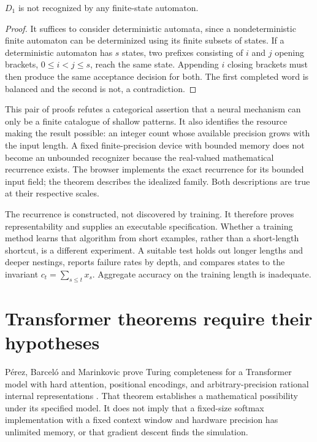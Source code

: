 \begin{proposition}
$D_1$ is not recognized by any finite-state automaton.
\end{proposition}
\begin{proof}
It suffices to consider deterministic automata, since a nondeterministic finite automaton can be determinized using its finite subsets of states. If a deterministic automaton has $s$ states, two prefixes consisting of $i$ and $j$ opening brackets, $0\le i<j\le s$, reach the same state. Appending $i$ closing brackets must then produce the same acceptance decision for both. The first completed word is balanced and the second is not, a contradiction.
\end{proof}

This pair of proofs refutes a categorical assertion that a neural mechanism can only be a finite catalogue of shallow patterns. It also identifies the resource making the result possible: an integer count whose available precision grows with the input length. A fixed finite-precision device with bounded memory does not become an unbounded recognizer because the real-valued mathematical recurrence exists. The browser implements the exact recurrence for its bounded input field; the theorem describes the idealized family. Both descriptions are true at their respective scales.

The recurrence is constructed, not discovered by training. It therefore proves representability and supplies an executable specification. Whether a training method learns that algorithm from short examples, rather than a short-length shortcut, is a different experiment. A suitable test holds out longer lengths and deeper nestings, reports failure rates by depth, and compares states to the invariant $c_t=\sum_{s\le t}x_s$. Aggregate accuracy on the training length is inadequate.

\section{Transformer theorems require their hypotheses}

P\'erez, Barcel\'o and Marinkovic prove Turing completeness for a Transformer model with hard attention, positional encodings, and arbitrary-precision rational internal representations \cite{LLperez}. That theorem establishes a mathematical possibility under its specified model. It does not imply that a fixed-size softmax implementation with a fixed context window and hardware precision has unlimited memory, or that gradient descent finds the simulation.

